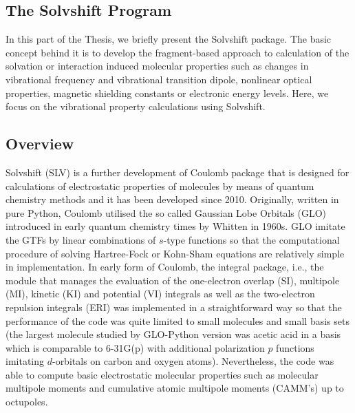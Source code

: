 \documentclass[b5paper,oneside,fleqn,11pt]{book}
\begin{document}
\begin{refsection}
\printbibliography[heading=subbibintoc,title={References}]
\end{refsection}




\begin{refsection}
\chapter{The Solvshift Program\label{c:slv}}

In this part of the Thesis, we briefly present the {\sc Solvshift}
package. The basic concept behind it is to develop the fragment\hyp{}based
approach to calculation of the solvation or interaction induced
molecular properties such as changes in vibrational frequency and vibrational 
transition dipole, nonlinear optical properties, magnetic shielding
constants or electronic energy levels. Here, we focus on the
vibrational property calculations using {\sc Solvshift}.

\section{Overview}

{\sc Solvshift} (SLV) is a further development of {\sc Coulomb} package
that is designed for calculations of electrostatic properties of molecules
by means of quantum chemistry methods and it has been developed
since 2010. Originally, written in pure Python, {\sc Coulomb} utilised
the so called Gaussian Lobe Orbitals (GLO) introduced in early quantum chemistry
times by Whitten in 1960s. \citep{Whitten.JCP.1966,Whitten.JCP.1969} 
GLO imitate the GTFs by linear combinations
of $s$-type functions so that the computational procedure of solving
Hartree\hyp{}Fock or Kohn\hyp{}Sham equations are relatively simple
in implementation. In early form of {\sc Coulomb}, the integral package, i.e.,
the module that manages the evaluation of the one\hyp{}electron overlap (SI), multipole (MI),
kinetic (KI) and
potential (VI) integrals as well as the two\hyp{}electron
repulsion integrals (ERI) was implemented in a straightforward way
so that the performance of the code was quite limited to small molecules
and small basis sets (the largest molecule studied by GLO\hyp{}Python version
was acetic acid in a basis which is comparable to 6-31G(p) with additional polarization
$p$ functions imitating $d$-orbitals on carbon and oxygen atoms). Nevertheless,
the code was able to compute basic electrostatic molecular properties such as
molecular multipole moments and cumulative atomic multipole moments 
(CAMM's) \citep{Sokalski.Poirier.CPL.1983} up to octupoles.
 

\end{refsection}
\end{document}
